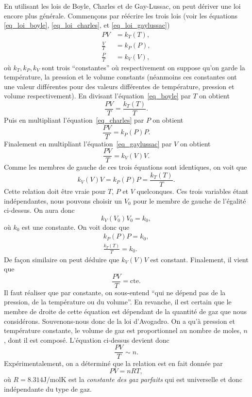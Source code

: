 \documentclass[a4paper,12pt]{book}
\newcommand{\mol}{\mathrm{mol}}
\newcommand{\K}{\mathrm{K}}
\newcommand{\J}{\mathrm{J}}
\begin{document}
En utilisant les lois de Boyle, Charles et de Gay-Lussac, on peut dériver une loi encore plus générale.
Commençons par réécrire les trois lois (voir les équations \eqref{eq_loi_boyle}, \eqref{eq_loi_charles}, et \eqref{eq_loi_gaylussac})
\begin{align}
PV&=k_T(T),\label{eq_boyle}\\
\frac{V}{T}&=k_P(P),\label{eq_charles}\\
\frac{P}{T}&=k_V(V)\label{eq_gaylussac},
\end{align}
où $k_T,k_P,k_V$ sont trois ``constantes'' où respectivement on suppose qu'on garde la température, 
la pression et le volume constants (néanmoins ces constantes ont une valeur différentes pour des valeurs
différentes de température, pression et volume respectivement). En divisant l'équation~\eqref{eq_boyle}
par $T$ on obtient 
\begin{equation}
\frac{PV}{T}=\frac{k_T(T)}{T}.
\end{equation}
Puis en multipliant l'équation~\eqref{eq_charles} par $P$ on obtient
\begin{equation}
\frac{PV}{T}=k_P(P)P.
\end{equation}
Finalement en multipliant l'équation~\eqref{eq_gaylussac} par $V$ on obtient
\begin{equation}
\frac{PV}{T}=k_V(V)V.
\end{equation}
Comme les membres de gauche de ces trois équations sont identiques, on voit que
\begin{equation}
k_V(V)V=k_P(P)P=\frac{k_T(T)}{T}.
\end{equation}
Cette relation doit être vraie pour $T$, $P$ et $V$ quelconques. 
Ces trois variables étant indépendantes, nous pouvons choisir 
un $V_0$ pour le membre de gauche de l'égalité ci-dessus. On aura donc
\begin{equation}
k_V(V_0)V_0=k_0,
\end{equation}
où $k_0$ est une constante. On voit donc que 
\begin{align}
k_P(P)P=k_0,\\
\frac{k_T(T)}{T}=k_0.
\end{align}
De façon similaire on peut déduire que $k_V(V)V$ est constant.
Finalement, il vient que
\begin{equation}
\frac{PV}{T}=\mbox{cte}.
\end{equation}
Il faut réaliser que par constante, on sous-entend ``qui ne dépend pas de la pression, de la température ou du volume''.
En revanche, il est certain que le membre de droite de cette équation est dépendant de la quantité de gaz
que nous considérons. Souvenons-nous donc de la loi d'Avogadro. On a qu'à pression et température constante,
le volume de gaz est proportionnel au nombre de moles, $n$, dont il est composé. L'équation ci-dessus devient donc
\begin{equation}
\frac{PV}{T}\sim n.
\end{equation}
Expérimentalement, on a déterminé que la relation est en fait donnée par
\begin{equation}
PV=nRT,
\end{equation}
où $R=8.314\J/\mol \K$ est la \textit{constante des gaz parfaits} qui est universelle et donc indépendante du type de gaz.
\end{document}
